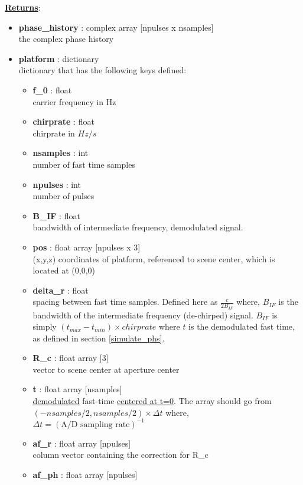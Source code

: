 \documentclass{article}
\newcommand{\defs}[2]{\textbf{{#1}} : {#2}}
\begin{document}
\noindent \underline{\textbf{Returns}}:
\begin{itemize}
	\item \defs{phase\_history}{complex array [npulses x nsamples]}\\
		the complex phase history
	  \item \defs{platform}{dictionary}\\
	  	dictionary that has the following keys defined:
	  \begin{itemize}
	    \item \defs{f\_0}{float}\\
	    	carrier frequency in Hz
		\item \defs{chirprate}{float}\\
		   	chirprate in $Hz/s$
	    \item \defs{nsamples}{int}\\
	    	number of fast time samples
	    \item \defs{npulses}{int}\\
	    	number of pulses
	    \item \defs{B\_IF}{float}\\
	    	bandwidth of intermediate frequency, demodulated signal.
	    \item \defs{pos}{float array [npulses x 3]}\\
	       	(x,y,z) coordinates of platform, referenced to scene center, which is located at (0,0,0)
	    \item \defs{delta\_r}{float}\\
       	   	spacing between fast time samples.  Defined here as $\frac{c}{2B_{IF}}$ where, $B_{IF}$ is the bandwidth of the intermediate frequency (de-chirped) signal.  $B_{IF}$ is simply $(t_{max}-t_{min})\times chirprate$ where $t$ is the demodulated fast time, as defined in section \ref{simulate_phs}.
	    \item \defs{R\_c}{float array [3]}\\
	     	vector to scene center at aperture center
	    \item \defs{t}{float array [nsamples]}\\
   	    	\underline{demodulated} fast-time \underline{centered at t=0}.  The array should go from $(-nsamples/2, nsamples/2)\times\Delta t$ where, $\Delta t = (\mbox{A/D sampling rate})^{-1}$
   	    \item\defs{af\_r}{float array [npulses]}\\
   	    	column vector containing the correction for R\_c
	    \item\defs{af\_ph}{float array [npulses]}\\

\end{itemize}
\end{itemize}
\end{document}
